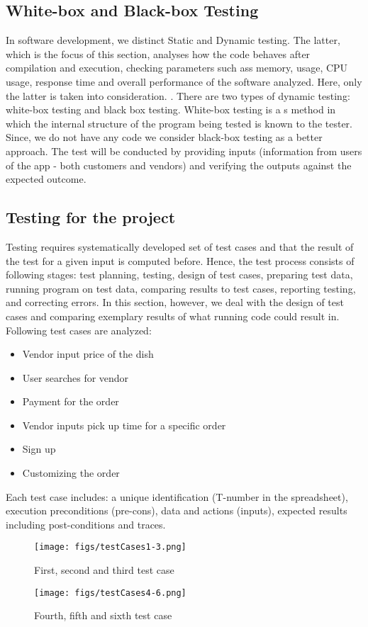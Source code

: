 \subsection{White-box and Black-box Testing}
In software development, we distinct Static and Dynamic testing. The latter, which is the focus of this section, analyses how the code behaves after compilation and execution, checking parameters such ass memory, usage, CPU usage, response time and overall performance of the software analyzed. Here, only the latter is taken into consideration. \cite{Dynamic_Testing}.
There are two types of dynamic testing: white-box testing and black box testing. White-box testing is a s method in which the internal structure of the program being tested is known to the tester. Since, we do not have any code we consider black-box testing as a better approach. The test will be conducted by providing inputs (information from users of the app - both customers and vendors) and verifying the outputs against the expected outcome.

\subsection{Testing for the project}
Testing requires systematically developed set of test cases and that the result of the test for a given input is computed before. Hence, the test process consists of following stages: test planning, testing, design of test cases, preparing test data, running program on test data, comparing results to test cases, reporting testing, and correcting errors. In this section, however, we deal with the design of test cases and comparing exemplary results of what running code could result in. Following test cases are analyzed:

\begin{itemize}
\item Vendor input price of the dish
\item User searches for vendor
\item Payment for the order
\item Vendor inputs pick up time for a specific order
\item Sign up
\item Customizing the order
\end{itemize}

Each test case includes: a unique identification (T-number in the spreadsheet), execution preconditions (pre-cons), data and actions (inputs), expected results including post-conditions and traces.

\begin{figure}[h!]
  \centering
  \texttt{[image: figs/testCases1-3.png]}
  \caption{First, second and third test case}
  \label{First, second and third test case}
\end{figure}

\begin{figure}[h!]
  \centering
  \texttt{[image: figs/testCases4-6.png]}
  \caption{Fourth, fifth and sixth test case}
  \label{Fourth, fifth and sixth test case}
\end{figure}
